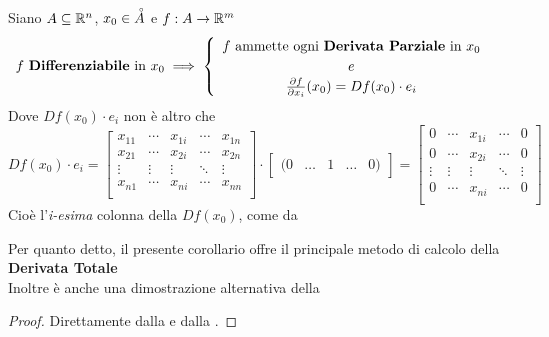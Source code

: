 \begin{corollary}
	\label{coro:se_diff_deriv_parz}
	Siano $A \subseteq \mathbb{R}^n$, $x_0 \in \accentset{\circ}{A}$ e $f:A \to \mathbb{R}^m$
	\[
		f \text{ \textbf{Differenziabile} in } x_0
		\implies
		\begin{cases}
			\begin{array}{c}
				f \text{ ammette ogni \textbf{Derivata Parziale} in } x_0\\
				e\\
				\frac{\partial f}{\partial x_i}(x_0) = Df(x_0) \cdot e_i
			\end{array}
		\end{cases}
	\]
	Dove $Df(x_0) \cdot e_i$ non è altro che
	\[
		Df(x_0) \cdot e_i =
		\begin{bmatrix}
			x_{11} & \cdots & x_{1i} & \cdots & x_{1n}\\
			x_{21} & \cdots & x_{2i} & \cdots & x_{2n}\\
			\vdots & \vdots & \vdots & \ddots & \vdots\\
			x_{n1} & \cdots & x_{ni} & \cdots & x_{nn}\\
		\end{bmatrix}
		\cdot
		\begin{bmatrix}
			(0 & \dots & 1 & \dots & 0)
		\end{bmatrix}
		=
		\begin{bmatrix}
			0 & \cdots & x_{1i} & \cdots & 0\\
			0 & \cdots & x_{2i} & \cdots & 0\\
			\vdots & \vdots & \vdots & \ddots & \vdots\\
			0 & \cdots & x_{ni} & \cdots & 0\\
		\end{bmatrix}
	\]
	Cioè l'\textit{i-esima} colonna della $Df(x_0)$, come da 
	\begin{note}
		Per quanto detto, il presente corollario offre il principale metodo di calcolo della \textbf{Derivata Totale}\\
		Inoltre è anche una dimostrazione alternativa della 
	\end{note}
	\begin{proof}
		Direttamente dalla  e dalla .
	\end{proof}
\end{corollary}
